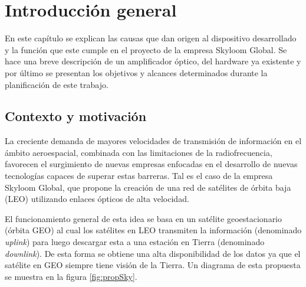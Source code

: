 
\chapter{Introducción general} %

\label{Chapter1} %
\label{IntroGeneral}


\newcommand{\keyword}[1]{\textbf{#1}}
\newcommand{\tabhead}[1]{\textbf{#1}}
\newcommand{\code}[1]{\texttt{#1}}
\newcommand{\file}[1]{\texttt{\bfseries#1}}
\newcommand{\option}[1]{\texttt{\itshape#1}}
\newcommand{\grados}{$^{\circ}$}


En este capítulo se explican las causas que dan origen al dispositivo desarrollado y la función que este cumple en el proyecto de la empresa Skyloom Global. Se hace una breve descripción de un amplificador óptico, del hardware ya existente y por último se presentan los objetivos y alcances determinados durante la planificación de este trabajo.


\section{Contexto y motivación}

La creciente demanda de mayores velocidades de transmisión de información en el ámbito aeroespacial, combinada con las limitaciones de la radiofrecuencia, favorecen el surgimiento de nuevas empresas enfocadas en el desarrollo de nuevas tecnologías capaces de superar estas barreras. Tal es el caso de la empresa Skyloom Global, que propone la creación de una red de satélites de órbita baja (LEO) utilizando enlaces ópticos de alta velocidad.

El funcionamiento general de esta idea se basa en un satélite geoestacionario (órbita GEO) al cual los satélites en LEO transmiten la información (denominado \textit{uplink}) para luego descargar esta a una estación en Tierra (denominado \textit{downlink}). De esta forma se obtiene una alta disponibilidad de los datos ya que el satélite en GEO siempre tiene visión de la Tierra. Un diagrama de esta propuesta se muestra en la figura \ref{fig:propSky}.

